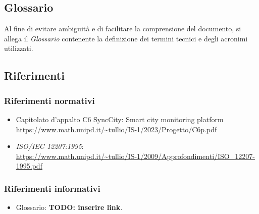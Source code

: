 \subsection{Glossario}
Al fine di evitare ambiguità e di facilitare la comprensione del documento, si allega il \textit{Glossario} contenente la definizione dei termini tecnici e degli acronimi utilizzati.

\subsection{Riferimenti}
\subsubsection{Riferimenti normativi}
\begin{itemize}
	\item Capitolato d'appalto C6 SyncCity: Smart city monitoring platform \\ \url{https://www.math.unipd.it/~tullio/IS-1/2023/Progetto/C6p.pdf}
	\item \textit{ISO/IEC 12207:1995}: \\ \url{https://www.math.unipd.it/~tullio/IS-1/2009/Approfondimenti/ISO_12207-1995.pdf}
	
\end{itemize}
\subsubsection{Riferimenti informativi}
\begin{itemize}
    \item Glossario: \textbf{TODO: inserire link}.
\end{itemize}